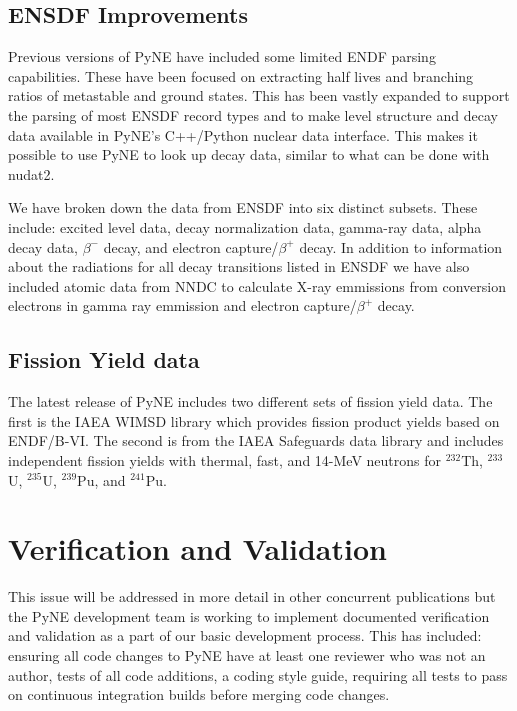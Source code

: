 \documentclass{anstrans}
\begin{document}
\subsection{ENSDF Improvements}

Previous versions of PyNE have included some limited ENDF parsing capabilities. These have been focused on extracting half lives and branching ratios of metastable and ground states. This has been vastly expanded to support the parsing of most ENSDF record types and to make level structure and decay data available in PyNE's C++/Python nuclear data interface. This makes it possible to use PyNE to look up decay data, similar to what can be done with nudat2. 

We have broken down the data from ENSDF into six distinct subsets. These include: excited level data, decay normalization data, gamma-ray data, alpha decay data, $\beta^-$ decay, and electron capture/$\beta^+$ decay. In addition to information about the radiations for all decay transitions listed in ENSDF we have also included atomic data from NNDC to calculate X-ray emmissions from conversion electrons in gamma ray emmission and electron capture/$\beta^+$ decay.

\subsection{Fission Yield data}

The latest release of PyNE includes two different sets of fission yield data. The first is the IAEA WIMSD library which provides fission product yields based on ENDF/B-VI. The second is from the IAEA Safeguards data library and includes independent fission yields with thermal, fast, and 14-MeV neutrons for $^{232}$Th, $^{233}$U, $^{235}$U, $^{239}$Pu, and $^{241}$Pu.

\section{Verification and Validation}

This issue will be addressed in more detail in other concurrent publications but the PyNE development team is working to implement documented verification and validation as a part of our basic development process. This has included: ensuring all code changes to PyNE have at least one reviewer who was not an author, tests of all code additions, a coding style guide, requiring all tests to pass on continuous integration builds before merging code changes. 
\end{document}
